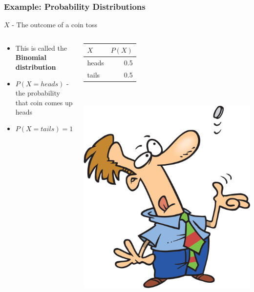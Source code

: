 \documentclass[12pt]{beamer} %
\begin{document}
\begin{frame}
\frametitle{Example: Probability Distributions}
$X$ - The outcome of a coin toss
\begin{columns}
    \begin{column}{0.75\textwidth}
\begin{itemize}
\item This is called the \textbf{Binomial distribution}
\item $P(X=heads)$ - the probability that coin comes up heads
\item $P(X=tails) = 1-P(X=heads)$
\end{itemize}
    \end{column}
    \begin{column}{0.25\textwidth}
\begin{tabular}{|l|r|}
\hline
$X$ & $P(X)$\\
\hline
heads & 0.5\\
tails & 0.5\\
\hline
\end{tabular}\\

\begin{center}
\includegraphics[width=\columnwidth]{figures/uncert_fig_tossingcoin.png}
\end{center}
    \end{column}
\end{columns}
\end{frame}
\end{document}
